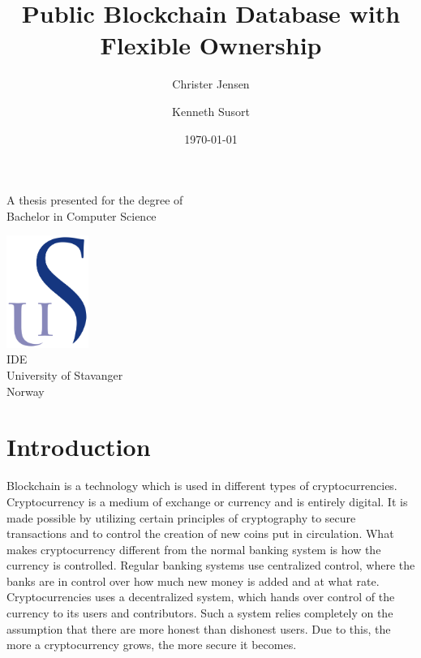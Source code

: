 \documentclass[12pt]{article}
\title{Public Blockchain Database with Flexible Ownership}
\author{Christer Jensen \and Kenneth Susort}
\date{\today}
\begin{document}

\begin{titlepage}
 \begin{center}
  
  \huge
  \textbf{\thetitle}
  
  \vspace{1.5cm}
  
  \textbf{\large\theauthor}
  
  \vfill
  
  {\Large A thesis presented for the degree of\\
  Bachelor in Computer Science}
  
  \vspace{0.8cm}
  
  \includegraphics[width=0.2\textwidth]{university_logo.png}\\
  \large
  IDE\\
  University of Stavanger\\
  Norway\\
  \thedate
  
 \end{center}
\end{titlepage}


\tableofcontents

\newpage
{}
\setcounter{page}{\theCurrentPage}

\section{Introduction}

Blockchain is a technology which is used in different types of cryptocurrencies. Cryptocurrency is a medium of exchange or currency and is entirely digital. It is made possible by utilizing certain principles of cryptography to secure transactions and to control the creation of new coins put in circulation. What makes cryptocurrency different from the normal banking system is how the currency is controlled. Regular banking systems use centralized control, where the banks are in control over how much new money is added and at what rate. Cryptocurrencies uses a decentralized system, which hands over control of the currency to its users and contributors. Such a system relies completely on the assumption that there are more honest than dishonest users. Due to this, the more a cryptocurrency grows, the more secure it becomes. 
\end{document}
